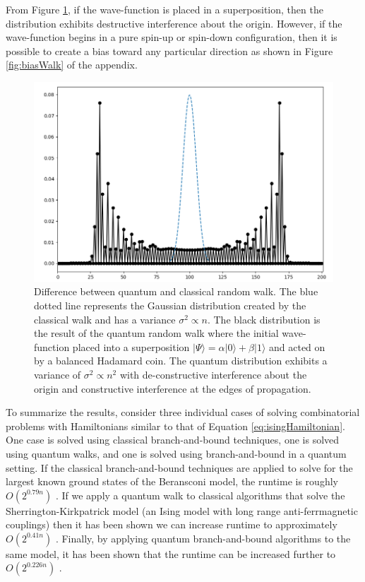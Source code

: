 From Figure \ref{fig:quantumWalk}, if the wave-function is placed in a superposition, then the distribution exhibits destructive interference about the origin.
However, if the wave-function begins in a pure spin-up or spin-down configuration, then it is possible to create a bias toward any particular direction as shown in Figure \ref{fig:biasWalk} of the appendix.
\begin{figure}[H]
	\begin{center}
		\includegraphics[width=12cm]{images/afunc2}
	\end{center}
	\caption{\doublespacing Difference between quantum and classical random walk. The blue dotted line represents the Gaussian distribution created by the classical walk and has a variance $\sigma^2 \propto n$. The black distribution is the result of the quantum random walk where the initial wave-function placed into a superposition $|\Psi\rangle = \alpha|0\rangle + \beta|1\rangle$ and acted on by a balanced Hadamard coin. The quantum distribution exhibits a variance of $\sigma^2 \propto n^2$ with de-constructive interference about the origin and constructive interference at the edges of propagation.}
	\label{fig:quantumWalk}
\end{figure}
\noindent
To summarize the results, consider three individual cases of solving combinatorial problems with Hamiltonians similar to that of Equation \ref{eq:isingHamiltonian}.
One case is solved using classical branch-and-bound techniques, one is solved using quantum walks, and one is solved using branch-and-bound in a quantum setting. 
If the classical branch-and-bound techniques are applied to solve for the largest known ground states of the Beransconi model, the runtime is roughly $O(2^{0.79n})$ \cite{packebusch2016low}. 
If we apply a quantum walk to classical algorithms that solve the Sherrington-Kirkpatrick model (an Ising model with long range anti-ferrmagnetic couplings) then it has been shown we can increase runtime to approximately $O(2^{0.41n})$ \cite{callison2019finding}. 
Finally, by applying quantum branch-and-bound algorithms to the same model, it has been shown that the runtime can be increased further to $O(2^{0.226n})$ \cite{montanaro2020quantum}.